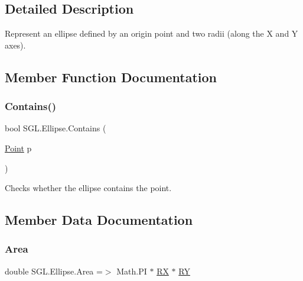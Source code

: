 \subsection{Detailed Description}
Represent an ellipse defined by an origin point and two radii (along the X and Y axes). 



\subsection{Member Function Documentation}
\mbox{\label{class_s_g_l_1_1_ellipse_a4aa98efe82607feabecf228d21339e00}} 
\subsubsection{\texorpdfstring{Contains()}{Contains()}}
{\footnotesize\ttfamily bool S\+G\+L.\+Ellipse.\+Contains (\begin{DoxyParamCaption}\item[{\mbox{\hyperlink{struct_s_g_l_1_1_point}{Point}}}]{p }\end{DoxyParamCaption})\hspace{0.3cm}{\ttfamily [inline]}}



Checks whether the ellipse contains the point. 



\subsection{Member Data Documentation}
\mbox{\label{class_s_g_l_1_1_ellipse_a8259d2766fa4d206859cdc874100517b}} 
\subsubsection{\texorpdfstring{Area}{Area}}
{\footnotesize\ttfamily double S\+G\+L.\+Ellipse.\+Area =$>$ Math.\+PI $\ast$ \mbox{\hyperlink{class_s_g_l_1_1_ellipse_ac6630cfb928ba11742a1efefe7ed41ca}{RX}} $\ast$ \mbox{\hyperlink{class_s_g_l_1_1_ellipse_af1df83b66e02fb6ebf969e608fc018d9}{RY}}}



